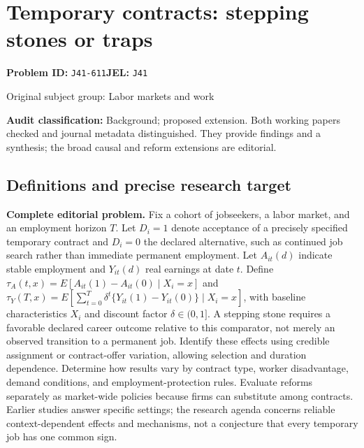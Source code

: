 \documentclass[11pt,a4paper]{article}
\begin{document}
\section*{Temporary contracts: stepping stones or traps}
\textbf{Problem ID:} \texttt{J41-611}\quad \textbf{JEL:} \texttt{J41}\par
\label{problem:OP-0359}
{\sffamily\small\color{muted}Original subject group: Labor markets and work\par}
\label{definitions:problem:30007641}
\textbf{Audit classification:} Background; proposed extension. Both working papers checked and journal metadata distinguished. They provide findings and a synthesis; the broad causal and reform extensions are editorial.
\subsection*{Definitions and precise research target}
\textbf{Complete editorial problem.} Fix a cohort of jobseekers, a labor market, and an employment horizon \(T\). Let \(D_i=1\) denote acceptance of a precisely specified temporary contract and \(D_i=0\) the declared alternative, such as continued job search rather than immediate permanent employment. Let \(A_{it}(d)\) indicate stable employment and \(Y_{it}(d)\) real earnings at date \(t\). Define \(\tau_A(t,x)=E[A_{it}(1)-A_{it}(0)\mid X_i=x]\) and \(\tau_Y(T,x)=E[\sum_{t=0}^{T}\delta^t\{Y_{it}(1)-Y_{it}(0)\}\mid X_i=x]\), with baseline characteristics \(X_i\) and discount factor \(\delta\in(0,1]\). A stepping stone requires a favorable declared career outcome relative to this comparator, not merely an observed transition to a permanent job. Identify these effects using credible assignment or contract-offer variation, allowing selection and duration dependence. Determine how results vary by contract type, worker disadvantage, demand conditions, and employment-protection rules. Evaluate reforms separately as market-wide policies because firms can substitute among contracts. Earlier studies answer specific settings; the research agenda concerns reliable context-dependent effects and mechanisms, not a conjecture that every temporary job has one common sign.
\end{document}
